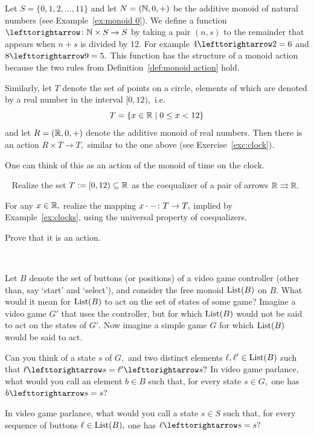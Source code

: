\documentclass[CT4S-EN-RU]{subfiles}
\begin{document}
\begin{remarkRUS}\label{rmk:monoid action}
\end{remarkRUS}

\begin{exampleENG}\label{ex:clocks}
Let $S=\{0,1,2,\ldots,11\}$ and let $N=({\mathbb N},0,+)$ be the additive monoid of natural numbers (see Example~\ref{ex:monoid 0}).  We define a function $\acts\taking\NN\times S\to S$ by taking a pair $(n,s)$ to the remainder that appears when $n+s$ is divided by 12. For example $4\acts 2=6$ and $8\acts 9 = 5.$ This function has the structure of a monoid action because the two rules from Definition~\ref{def:monoid action} hold.

Similarly, let $T$ denote the set of points on a circle, elements of which are denoted by a real number in the interval $[0,12),$ i.e. $$T=\{x\in{\mathbb R}{\;|\;}0\leq x< 12\}$$ and let $R=({\mathbb R},0,+)$ denote the additive monoid of real numbers. Then there is an action $R\times T\to T,$ similar to the one above (see Exercise~\ref{exc:clock}).

One can think of this as an action of the monoid of time on the clock.
\end{exampleENG}

\begin{exampleRUS}\label{ex:clocks}
\end{exampleRUS}

\begin{exerciseENG}\label{exc:clock}~
\sexc Realize the set $T:=[0,12)\subseteq{\mathbb R}$ as the coequalizer of a pair of arrows ${\mathbb R}\rightrightarrows{\mathbb R}.$
\item For any $x\in{\mathbb R},$ realize the mapping $x\cdot-\colon T\rightarrow T,$ implied by Example~\ref{ex:clocks}, using the universal property of coequalizers.
\item Prove that it is an action.
\endsexc
\end{exerciseENG}

\begin{exerciseRUS}\label{exc:clock}~
\end{exerciseRUS}

\begin{exerciseENG}
Let $B$ denote the set of buttons (or positions) of a video game controller (other than, say `start' and `select'), and consider the free monoid $\textnormal{List}(B)$ on $B.$
\sexc What would it mean for $\textnormal{List}(B)$ to act on the set of states of some game? Imagine a video game $G'$ that uses the controller, but for which $\textnormal{List}(B)$ would not be said to act on the states of $G'.$ Now imagine a simple game $G$ for which $\textnormal{List}(B)$ would be said to act.
\item Can you think of a state $s$ of $G,$ and two distinct elements $\ell,\ell'\in\textnormal{List}(B)$ such that $\ell\acts s=\ell'\acts s?$ In video game parlance, what would you call an element $b\in B$ such that, for every state $s\in G,$ one has $b\acts s=s?$
\item In video game parlance, what would you call a state $s\in S$ such that, for every sequence of buttons $\ell\in\textnormal{List}(B),$ one has $\ell\acts s=s?$
\endsexc
\end{exerciseENG}
\end{document}
